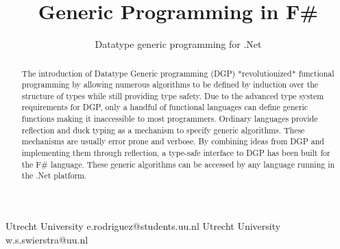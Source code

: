 \documentclass{sigplanconf}
\begin{document}
\setlength{\pdfpageheight}{\paperheight}
\setlength{\pdfpagewidth}{\paperwidth}






\title{Generic Programming in F\#}
\subtitle{Datatype generic programming for .Net}

           {Utrecht University}
           {e.rodriguez@students.uu.nl}
           {Utrecht University}
           {w.s.swierstra@uu.nl}

\newcommand{\Sum}{\mathtt{Sum}}
\newcommand{\Prod}{\mathtt{Prod}}
\newcommand{\Meta}{\mathtt{Meta}}
\newcommand{\K}{\mathtt{K}}
\newcommand{\Id}{\mathtt{Id}}

\maketitle

\begin{abstract}
  The introduction of Datatype Generic programming (DGP)
  *revolutionized* functional programming by allowing numerous
  algorithms to be defined by induction over the structure of types
  while still providing type safety. Due to the advanced type system
  requirements for DGP, only a handful of functional languages can
  define generic functions making it inaccessible to most
  programmers. Ordinary languages provide reflection and duck typing
  as a mechanism to specify generic algorithms. These mechanisms are
  usually error prone and verbose. By combining ideas from DGP and
  implementing them through reflection, a type-safe interface to DGP
  has been built for the F\# language. These generic algorithms can be
  accessed by any language running in the .Net platform.
\end{abstract}
\end{document}
